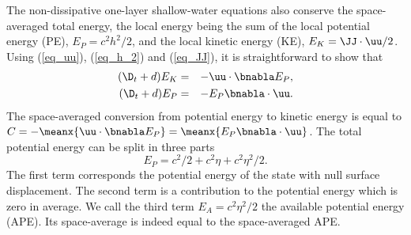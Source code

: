 The non-dissipative one-layer shallow-water equations also conserve
the space-averaged total energy, the local energy being the sum of the
local potential energy (PE), $E_P = c^2 h^2/2$, and the local kinetic
energy (KE), $E_K = \JJ\cdot\uu/2$.  Using (\ref{eq_uu}),
(\ref{eq_h_2}) and (\ref{eq_JJ}), it is straightforward to show that
\begin{eqnarray}
(\D_t + d) E_K
&=&  
- \uu \cdot \bnabla E_P, \\
(\D_t + d) E_P
&=&  
- E_P \bnabla \cdot \uu.
\end{eqnarray}
%
The space-averaged conversion from potential energy to kinetic energy
is equal to $C = -\meanx{ \uu \cdot \bnabla E_P } = \meanx{ E_P
\bnabla \cdot \uu }$.
%
The total potential energy can be split in three parts
\begin{equation}
E_P = c^2/2 + c^2\eta+ c^2 \eta^2/2.
\end{equation}
The first term corresponds the potential energy of the state with null
surface displacement.  The second term is a contribution to the
potential energy which is zero in average.  We call the third term
$E_A = c^2\eta^2/2$ the available potential energy (APE).  Its
space-average is indeed equal to the space-averaged APE.
